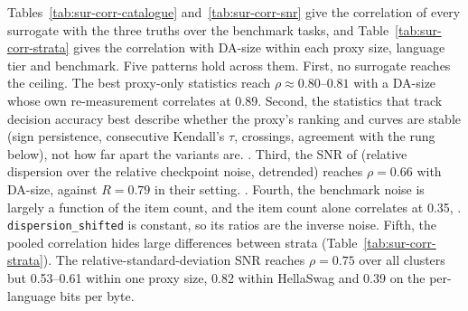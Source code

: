 Tables~\ref{tab:sur-corr-catalogue} and~\ref{tab:sur-corr-snr} give the correlation of every surrogate with the three truths over the benchmark tasks, and Table~\ref{tab:sur-corr-strata} gives the correlation with DA-size within each proxy size, language tier and benchmark.
Five patterns hold across them.
First, no surrogate reaches the ceiling. The best proxy-only statistics reach $\rho \approx 0.80$--$0.81$ with a DA-size whose own re-measurement correlates at 0.89.
Second, the statistics that track decision accuracy best describe whether the proxy's ranking and curves are stable (sign persistence, consecutive Kendall's $\tau$, crossings, agreement with the rung below), not how far apart the variants are. .
Third, the SNR of \citet{heineman_signal_2025} (relative dispersion over the relative checkpoint noise, detrended) reaches $\rho = 0.66$ with DA-size, against $R = 0.79$ in their setting. .
Fourth, the benchmark noise is largely a function of the item count, and the item count alone correlates at 0.35, . \texttt{dispersion\_shifted} is constant, so its ratios are the inverse noise.
Fifth, the pooled correlation hides large differences between strata (Table~\ref{tab:sur-corr-strata}). The relative-standard-deviation SNR reaches $\rho = 0.75$ over all clusters but 0.53--0.61 within one proxy size, 0.82 within HellaSwag and 0.39 on the per-language bits per byte.

